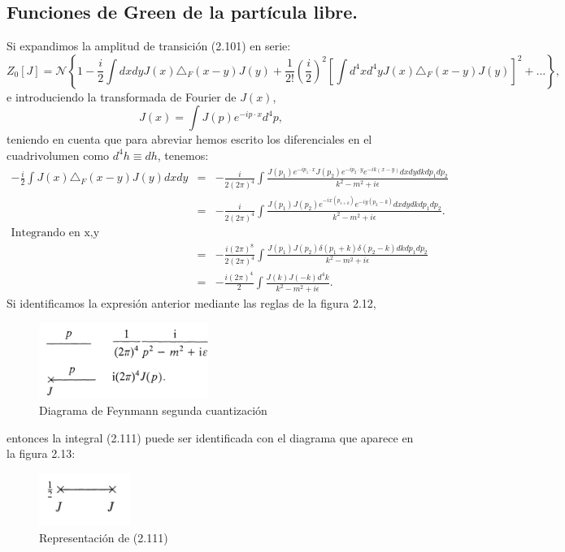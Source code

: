 \subsection{Funciones de Green de la partícula libre.}
Si expandimos la amplitud de transición (2.101) en serie:
\begin{equation}
Z_{0}[J]=\mathcal{N}\left\{ 1-\frac{i}{2}\int dxdyJ(x)\triangle_{F}(x-y)J(y)+\frac{1}{2!}\left(\frac{i}{2}\right)^{2}\left[\int d^{4}xd^{4}yJ(x)\triangle_{F}(x-y)J(y)\right]^{2}+...\right\},
\end{equation}
e introduciendo la transformada de Fourier de $J(x)$, 
\begin{equation}
J(x)=\int J(p)e^{-ip\cdot x}d^4p,
\end{equation}
teniendo en cuenta que para abreviar hemos escrito los diferenciales en el cuadrivolumen como $d^4h\equiv dh$, tenemos:
\begin{eqnarray}
\nonumber -\frac{i}{2}\int J(x)\triangle_F(x-y)J(y)dxdy&=&-\frac{i}{2(2\pi)^{4}}\int\frac{J(p_{1})e^{-ip_{1}\cdot x}J(p_{2})e^{-ip_{2}\cdot y}e^{-ik(x-y)}dxdydkdp_{1}dp_{2}}{k^{2}-m^{2}+i\epsilon}\\
\nonumber &=& -\frac{i}{2(2\pi)^{4}}\int\frac{J(p_{1})J(p_{2})e^{-ix(p_{1+k})}e^{-iy(p_{2}-k)}dxdydkdp_{1}dp_{2}}{k^{2}-m^{2}+i\epsilon}.\\
\nonumber \text{Integrando en x,y} &&\\
\nonumber &=& -\frac{i(2\pi)^{8}}{2(2\pi)^{4}}\int\frac{J(p_{1})J(p_{2})\delta(p_{1}+k)\delta(p_{2}-k)dkdp_{1}dp_{2}}{k^{2}-m^{2}+i\epsilon}\\
&=& -\frac{i(2\pi)^{4}}{2}\int\frac{J(k)J(-k)d^{4}k}{k^{2}-m^{2}+i\epsilon}.
\end{eqnarray}
Si identificamos la expresión anterior mediante las reglas de la figura 2.12,
\begin{figure}
\caption[Diagrama de Feynmann segunda cuantización]{Diagrama de Feynmann segunda cuantización}
\includegraphics[width=5.5cm]{Imagenes/Fig12}
\end{figure}
entonces la integral (2.111) puede ser identificada con el diagrama que aparece en la figura 2.13:
\begin{figure}
\caption[Diagrama de Feynmann segunda cuantización]{Representación de (2.111)}
\includegraphics[width=3cm]{Imagenes/Fig13}
\end{figure}
